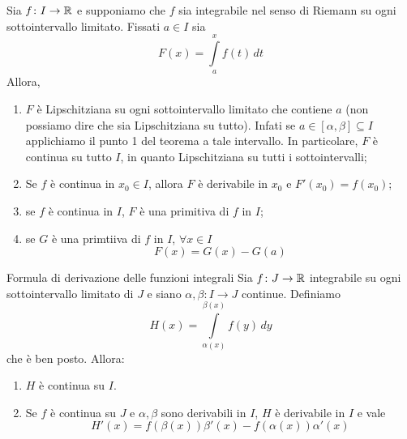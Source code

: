 \documentclass[a4paper]{article}
\begin{document}
\begin{snippetcorollary}{}
    Sia \(f \colon I \to \mathbb{R}\) e supponiamo che \(f\)
    sia integrabile nel senso di Riemann su ogni sottointervallo limitato.
    Fissati \(a\in I\) sia
    \[
        F(x) = \int\limits_a^x f(t) \, dt
    \]
    Allora, 
    \begin{enumerate}
        \item \(F\) è Lipschitziana su ogni sottointervallo limitato che contiene \(a\) (non possiamo dire che sia Lipschitziana su tutto).
        Infati se \(a\in [\alpha,\beta] \subseteq I\) applichiamo il punto 1 del teorema a tale intervallo.
        In particolare, \(F\) è continua su tutto \(I\), in quanto Lipschitziana su tutti i sottointervalli;
        \item Se \(f\) è continua in \(x_0 \in I\), allora \(F\) è derivabile in \(x_0\)
        e \(F'(x_0) = f(x_0)\);
        \item se \(f\) è continua in \(I\), \(F\) è una primitiva di \(f\) in \(I\);
        \item se \(G\) è una primtiiva di \(f\) in \(I\), \(\forall x \in I\)
        \[
            F(x) = G(x) - G(a)
        \]
    \end{enumerate}
\end{snippetcorollary}

\begin{snippetcorollary}{Formula di derivazione delle funzioni integrali}
    Sia \(f\colon J \to \mathbb{R}\) integrabile su ogni sottointervallo limitato di \(J\)
    e siano \(\alpha,\beta \colon I \to J\) continue. Definiamo
    \[
        H(x) = \int\limits_{\alpha(x)}^{\beta(x)}f(y)\,dy
    \]
    che è ben posto.
    Allora:
    \begin{enumerate}
        \item \(H\) è continua su \(I\). 
        \item Se \(f\) è continua su \(J\)
        e \(\alpha,\beta\) sono derivabili in \(I\), \(H\) è derivabile in \(I\) e vale
        \[
            H'(x) = f(\beta(x))\beta'(x) - f(\alpha(x))\alpha'(x)
        \]
    \end{enumerate}
\end{snippetcorollary}
\end{document}
